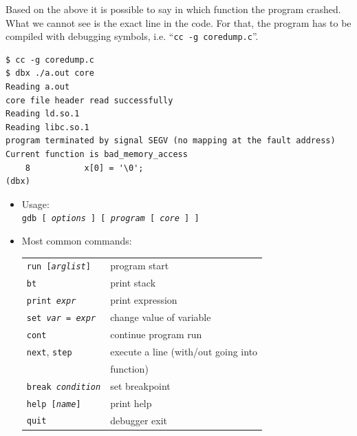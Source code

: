 \begin{itemize}
Based on the above it is possible to say in which function the program crashed.
What we cannot see is the exact line in the code. For that, the program has to be
compiled with debugging symbols, i.e. ``\texttt{cc -g coredump.c}''.

\begin{verbatim}
$ cc -g coredump.c
$ dbx ./a.out core
Reading a.out
core file header read successfully
Reading ld.so.1
Reading libc.so.1
program terminated by signal SEGV (no mapping at the fault address)
Current function is bad_memory_access
    8           x[0] = '\0';
(dbx) 
\end{verbatim}

\end{itemize}


\begin{slide}
\begin{itemize}
\item Usage:\\
\texttt{gdb [ \emph{options} ] [ \emph{program} [ \emph{core} ] ]}
\item Most common commands:\\
\renewcommand{\arraystretch}{0.9}
\begin{tabular}{ll}
\texttt{run [\emph{arglist}]} & program start\\
\texttt{bt} & print stack\\
\texttt{print \emph{expr}} & print expression\\
\texttt{set \emph{var} = \emph{expr}} & change value of variable\\
\texttt{cont} & continue program run\\
\texttt{next}, \texttt{step} & execute a line (with/out going into\\*
& function)\\
\texttt{break \emph{condition}} & set breakpoint\\
\texttt{help [\emph{name}]} & print help\\
\texttt{quit} & debugger exit
\end{tabular}
\end{itemize}
\end{slide}

